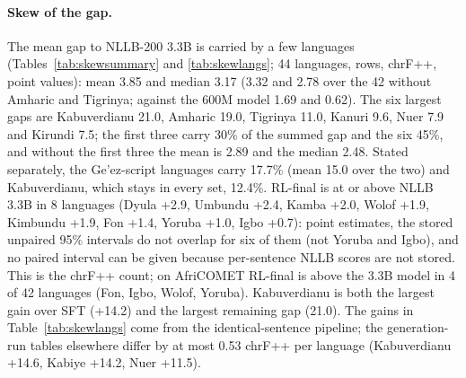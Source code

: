 \paragraph{Skew of the gap.} The mean gap to NLLB-200 3.3B is carried by a few languages (Tables~\ref{tab:skewsummary} and \ref{tab:skewlangs}; 44 languages, \nopair{} rows, chrF++, point values): mean 3.85 and median 3.17 (3.32 and 2.78 over the 42 without Amharic and Tigrinya; against the 600M model 1.69 and 0.62). The six largest gaps are Kabuverdianu 21.0, Amharic 19.0, Tigrinya 11.0, Kanuri 9.6, Nuer 7.9 and Kirundi 7.5; the first three carry 30\% of the summed gap and the six 45\%, and without the first three the mean is 2.89 and the median 2.48. Stated separately, the Ge'ez-script languages carry 17.7\% (mean 15.0 over the two) and Kabuverdianu, which stays in every set, 12.4\%. RL-final is at or above NLLB 3.3B in 8 languages (Dyula +2.9, Umbundu +2.4, Kamba +2.0, Wolof +1.9, Kimbundu +1.9, Fon +1.4, Yoruba +1.0, Igbo +0.7): point estimates, the stored unpaired 95\% intervals do not overlap for six of them (not Yoruba and Igbo), and no paired interval can be given because per-sentence NLLB scores are not stored. This is the chrF++ count; on AfriCOMET RL-final is above the 3.3B model in 4 of 42 languages (Fon, Igbo, Wolof, Yoruba). Kabuverdianu is both the largest gain over SFT (+14.2) and the largest remaining gap (21.0). The gains in Table~\ref{tab:skewlangs} come from the identical-sentence pipeline; the generation-run tables elsewhere differ by at most 0.53 chrF++ per language (Kabuverdianu +14.6, Kabiye +14.2, Nuer +11.5).





